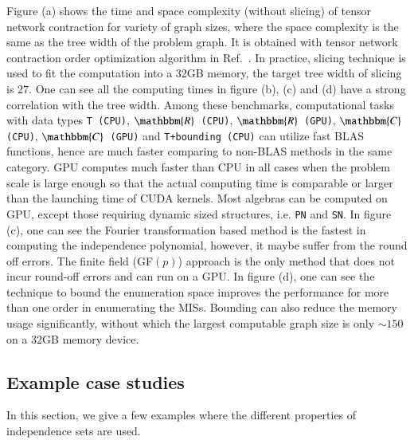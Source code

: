 \documentclass[onefignum, onetabnum]{siamart190516}
\newcommand{\<}{\langle}
\renewcommand{\>}{\rangle}
\newcommand{\Fig}[1]{Fig.~\ref{#1}}
\newcounter{example}
\begin{document}
Figure (a) shows the time and space complexity (without slicing) of tensor network contraction for variety of graph sizes, where the space complexity is the same as the tree width of the problem graph.
It is obtained with tensor network contraction order optimization algorithm in Ref.~\cite{Kalachev2021}.
In practice, slicing technique is used to fit the computation into a 32GB memory, the target tree width of slicing is $27$.
One can see all the computing times in figure (b), (c) and (d) have a strong correlation with the tree width.
Among these benchmarks, computational tasks with data types \texttt{T (CPU)},
\texttt{$\mathbbm{R}$ (CPU)}, \texttt{$\mathbbm{R}$ (GPU)}, \texttt{$\mathbbm{C}$ (CPU)}, \texttt{$\mathbbm{C}$ (GPU)} and \texttt{T+bounding (CPU)} can utilize fast BLAS functions, hence 
are much faster comparing to non-BLAS methods in the same category.
GPU computes much faster than CPU in all cases when the problem scale is large enough so that the actual computing time is comparable or larger than the launching time of CUDA kernels.
Most algebras can be computed on GPU, except those requiring dynamic sized structures, i.e. \texttt{PN} and \texttt{SN}.
In figure (c), one can see the Fourier transformation based method is the fastest in computing the independence polynomial,
however, it maybe suffer from the round off errors. The finite field (GF$(p)$) approach is the only method that does not incur round-off errors and can run on a GPU.
In figure (d), one can see the technique to bound the enumeration space improves the performance for more than one order in enumerating the MISs.
Bounding can also reduce the memory usage significantly, without which the largest computable graph size is only $\sim150$ on a 32GB memory device.

\subsection{Example case studies} In this section, we give a few examples where the different properties of independence sets are used.
\end{document}
